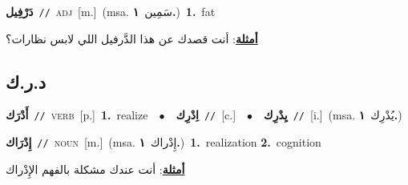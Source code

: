 \documentclass[10pt,a4paper,twoside]{article} %
\begin{document}
\begin{multicols}{2}
{\setlength\topsep{0pt}\textbf{\foreignlanguage{arabic}{دَرْفِيل}}\ {\color{gray}\texttt{//}\color{black}}\ \textsc{adj}\ [m.]\ \color{gray}(msa. \foreignlanguage{arabic}{سَمِين}~\foreignlanguage{arabic}{\textbf{١.}})\color{black}\ \textbf{1.}~fat\  \begin{flushright}\color{gray}\foreignlanguage{arabic}{\textbf{\underline{\foreignlanguage{arabic}{أمثلة}}}: أنت قصدك عن هذا الدَّرفيل اللي لابس نظارات؟}\end{flushright}\color{black}} \vspace{2mm}

\vspace{-3mm}
\subsection*{\color{blue}\foreignlanguage{arabic}{د.ر.ك}\color{blue}{}} 

{\setlength\topsep{0pt}\textbf{\foreignlanguage{arabic}{أَدْرَك}}\ {\color{gray}\texttt{//}\color{black}}\ \textsc{verb}\ [p.]\ \textbf{1.}~realize\ \ $\bullet$\ \ \setlength\topsep{0pt}\textbf{\foreignlanguage{arabic}{اِدْرِك}}\ {\color{gray}\texttt{//}\color{black}}\ [c.]\ \ $\bullet$\ \ \setlength\topsep{0pt}\textbf{\foreignlanguage{arabic}{يِدْرِك}}\ {\color{gray}\texttt{//}\color{black}}\ [i.]\ \color{gray}(msa. \foreignlanguage{arabic}{يُدْرِك}~\foreignlanguage{arabic}{\textbf{١.}})\color{black}\ } \vspace{2mm}

{\setlength\topsep{0pt}\textbf{\foreignlanguage{arabic}{إِدْرَاك}}\ {\color{gray}\texttt{//}\color{black}}\ \textsc{noun}\ [m.]\ \color{gray}(msa. \foreignlanguage{arabic}{إِدْراك}~\foreignlanguage{arabic}{\textbf{١.}})\color{black}\ \textbf{1.}~realization  \textbf{2.}~cognition\  \begin{flushright}\color{gray}\foreignlanguage{arabic}{\textbf{\underline{\foreignlanguage{arabic}{أمثلة}}}: أنت عندك مشكلة بالفهم الإِدْراك}\end{flushright}\color{black}} \vspace{2mm}


\end{multicols}
\end{document}
